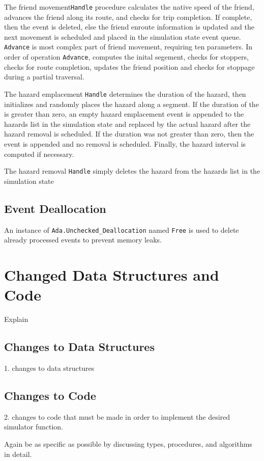\documentclass[12pt,letterpaper,titlepage]{article}
\newcommand{\code}[1]{\texttt{#1}}
\begin{document}
The friend movement\code{Handle} procedure calculates the native speed
of the friend, advances the friend along its route, and checks for
trip completion.  If complete, then the event is deleted, else the
friend enroute information is updated and the next movement is
scheduled and placed in the simulation state event queue.
\code{Advance} is most complex part of friend movement, requiring ten
parameters.  In order of operation \code{Advance}, computes the inital
segement, checks for stoppers, checks for route completion, updates
the friend position and checks for stoppage during a partial
traversal.


The hazard emplacement \code{Handle} determines the duration of the
hazard, then initializes and randomly places the hazard along a
segment.  If the duration of the is greater than zero, an empty hazard
emplacement event is appended to the hazards list in the simulation
state and replaced by the actual hazard after the hazard removal is
scheduled.  If the duration was not greater than zero, then the event
is appended and no removal is scheduled.  Finally, the hazard interval
is computed if necessary.

The hazard removal \code{Handle} simply deletes the hazard from the
hazards list in the simulation state

\subsection{Event Deallocation}

An instance of \code{Ada.Unchecked_Deallocation} named \code{Free} is
used to delete already processed events to prevent memory leaks.


\section{Changed Data Structures and Code}

Explain

\subsection{Changes to Data Structures}
1. changes to data structures


\subsection{Changes to Code}
2. changes to code that must be made in order to implement the desired
simulator function.

Again be as specific as possible by discussing types, procedures, and
algorithms in detail.
\end{document}
